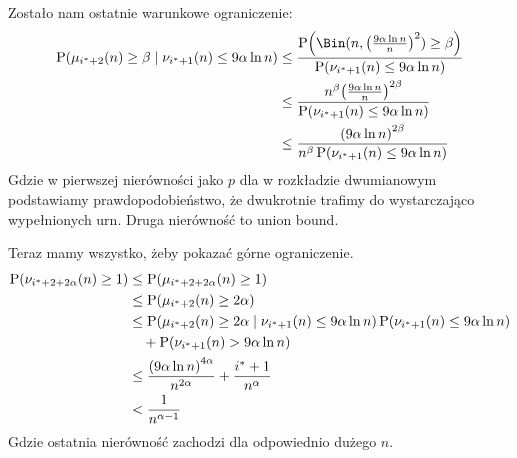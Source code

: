 Zostało nam ostatnie warunkowe ograniczenie:
\begin{align*}
	\prob\pars{\mu_{i^* + 2}(n) \geq \beta \mid \nu_{i^* + 1}(n) \leq 9\alpha\ln n} & \leq \frac{\prob\pars{\Bin(n, \pars{\frac{9\alpha\ln n}{n}}^2) \geq \beta}}{\prob\pars{\nu_{i^* + 1}(n) \leq 9\alpha\ln n}} \\
	                                                                                & \leq \frac{n^{\beta}\pars{\frac{9\alpha\ln n}{n}}^{2\beta}}{\prob\pars{\nu_{i^* + 1}(n) \leq 9\alpha\ln n}}                 \\
	                                                                                & \leq \frac{\pars{9\alpha\ln n}^{2 \beta}}{n^{\beta}\prob\pars{\nu_{i^* + 1}(n) \leq 9\alpha\ln n}}
\end{align*}
Gdzie w pierwszej nierówności jako \( p \) dla w rozkładzie dwumianowym podstawiamy prawdopodobieństwo, że dwukrotnie trafimy do wystarczająco wypełnionych urn. Druga nierówność to union bound.

Teraz mamy wszystko, żeby pokazać górne ograniczenie.
\begin{align*}
	\prob\pars{\nu_{i^* + 2 + 2\alpha}(n) \geq 1} & \leq \prob\pars{\mu_{i^* + 2 + 2\alpha}(n) \geq 1}                                                                                   \\
	                                              & \leq \prob\pars{\mu_{i^* + 2}(n) \geq 2\alpha}                                                                                       \\
	                                              & \leq \prob\pars{\mu_{i^* + 2}(n) \geq 2\alpha \mid \nu_{i^* + 1}(n) \leq 9\alpha\ln n}\prob\pars{\nu_{i^* + 1}(n) \leq 9\alpha\ln n} \\
	                                              & \quad + \prob\pars{\nu_{i^* + 1}(n) > 9\alpha\ln n}                                                                                  \\
	                                              & \leq \frac{\pars{9\alpha\ln n}^{4 \alpha}}{n^{2\alpha}} + \frac{i^* + 1}{n^{\alpha}}                                                 \\
	                                              & < \frac{1}{n^{\alpha - 1}}
\end{align*}
Gdzie ostatnia nierówność zachodzi dla odpowiednio dużego \( n \).
